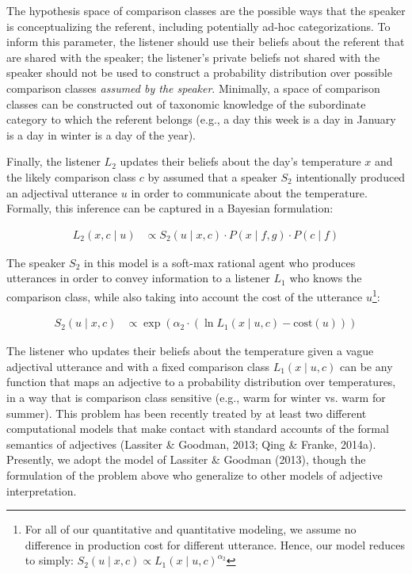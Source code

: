 \documentclass[doc]{apa6}
\begin{document}
The hypothesis space of comparison classes are the possible ways that the speaker is conceptualizing the referent, including potentially ad-hoc categorizations.
To inform this parameter, the listener should use their beliefs about the referent that are shared with the speaker; the listener's private beliefs not shared with the speaker should not be used to construct a probability distribution over possible comparison classes \emph{assumed by the speaker}.
Minimally, a space of comparison classes can be constructed out of taxonomic knowledge of the subordinate category to which the referent belongs (e.g., a day this week is a day in January is a day in winter is a day of the year).

Finally, the listener $L_2$ updates their beliefs about the day's temperature $x$ and the likely comparison class $c$ by assumed that a speaker $S_2$ intentionally produced an adjectival utterance $u$ in order to communicate about the temperature.
Formally, this inference can be captured in a Bayesian formulation:

\begin{align}
L_2(x, c \mid u) &\propto S_2(u \mid x, c) \cdot P(x \mid f, g) \cdot P(c \mid f) \label{eq:L2} 
\end{align}

The speaker $S_2$ in this model is a soft-max rational agent who produces utterances in order to convey information to a listener $L_{1}$ who knows the comparison class, while also taking into account the cost of the utterance $u$\footnote{For all of our quantitative and quantitative modeling, we assume no difference in production cost for different utterance. Hence, our model reduces to simply: $S_2(u \mid x, c) \propto L_{1}(x \mid u, c)^{ \alpha_{2}}$}: 

\begin{align}
S_2(u \mid x, c) &\propto \exp{(\alpha_{2} \cdot (\ln L_{1}(x \mid u, c) - \text{cost}(u) ))}\label{eq:S2} 
\end{align}

The listener who updates their beliefs about the temperature given a vague adjectival utterance and with a fixed comparison class $L_{1}(x \mid u, c)$ can be any function that maps an adjective to a probability distribution over temperatures, in a way that is comparison class sensitive (e.g., warm for winter vs. warm for summer). 
This problem has been recently treated by at least two different computational models that make contact with standard accounts of the formal semantics of adjectives (Lassiter \& Goodman, 2013; Qing \& Franke, 2014a).
Presently, we adopt the model of Lassiter \& Goodman (2013), though the formulation of the problem above who generalize to other models of adjective interpretation. 
\end{document}
